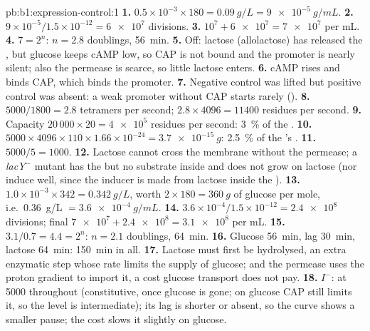 \begin{solution}{pb:b1:expression-control:1}
\textbf{1.} $0.5\times 10^{-3}\times 180 = \qty{0.09}{g/L} =
\qty{9e-5}{g/mL}$.
\textbf{2.} $9\times 10^{-5}/1.5\times 10^{-12} = \num{6e7}$ divisions.
\textbf{3.} $10^7 + \num{6e7} = \num{7e7}$  per mL.
\textbf{4.} $7 = 2^n$: $n = 2.8$ doublings, \qty{56}{min}.
\textbf{5.} Off: lactose (allolactose) has released the ,
but glucose keeps cAMP low, so CAP is not bound and the promoter is
nearly silent; also the permease is scarce, so little lactose enters.
\textbf{6.} cAMP rises and binds CAP, which binds the promoter.
\textbf{7.} Negative control was lifted but positive control was
absent: a weak promoter without CAP starts rarely ().
\textbf{8.} $5000/1800 = 2.8$ tetramers per second; $2.8\times 4096 =
\num{11400}$ residues per second.
\textbf{9.} Capacity $20\,000\times 20 = \num{4e5}$ residues per second:
\qty{3}{\%} of the .
\textbf{10.} $5000\times 4096\times 110\times 1.66\times 10^{-24} =
\qty{3.7e-15}{g}$: \qty{2.5}{\%} of the 's .
\textbf{11.} $5000/5 = 1000$.
\textbf{12.} Lactose cannot cross the membrane without the permease;
a \emph{lacY}$^-$ mutant has the  but no substrate inside and
does not grow on lactose (nor induce well, since the inducer is made
from lactose inside the ).
\textbf{13.} $1.0\times 10^{-3}\times 342 = \qty{0.342}{g/L}$, worth
$2\times 180 = \qty{360}{g}$ of glucose per mole, i.e.\ \qty{0.36}{g/L}
$= \qty{3.6e-4}{g/mL}$.
\textbf{14.} $3.6\times 10^{-4}/1.5\times 10^{-12} = \num{2.4e8}$
divisions; final $\num{7e7} + \num{2.4e8} = \num{3.1e8}$ per mL.
\textbf{15.} $3.1/0.7 = 4.4 = 2^n$: $n = 2.1$ doublings, \qty{64}{min}.
\textbf{16.} Glucose \qty{56}{min}, lag \qty{30}{min}, lactose
\qty{64}{min}: \qty{150}{min} in all.
\textbf{17.} Lactose must first be hydrolysed, an extra enzymatic step
whose rate limits the supply of glucose; and the permease uses the
proton gradient to import it, a cost glucose transport does not pay.
\textbf{18.} $I^-$:  at \num{5000} throughout (constitutive, once
glucose is gone; on glucose CAP still limits it, so the level is
intermediate); its lag is shorter or absent, so the curve shows a
smaller pause; the cost slows it slightly on glucose.

\end{solution}
